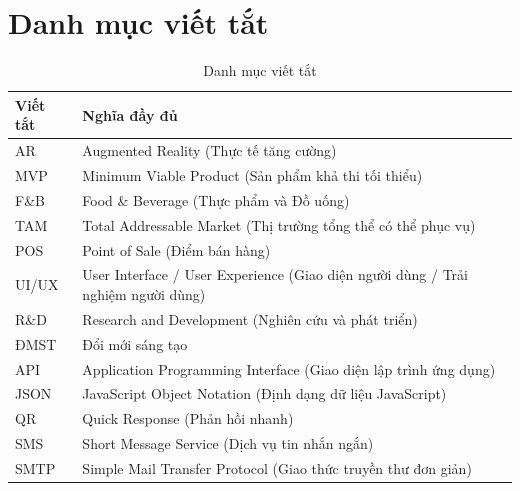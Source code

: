 \documentclass[12pt,a4paper]{article}
\begin{document}
\setcounter{page}{1} %
\pagestyle{fancy}
\fancyhf{} %
\fancyfoot[C]{\thepage} %
\renewcommand{\headrulewidth}{0.4pt} %
\renewcommand{\footrulewidth}{0pt}   %

\justifying %

\tableofcontents
\newpage

\listoftables
\newpage

\listoffigures
\newpage

\section*{Danh mục viết tắt} %

\begin{table}[H]
\centering
\caption{Danh mục viết tắt}
\label{tab:abbreviations}
\begin{tabular}{@{}p{3cm}@{\hspace{1cm}}p{10cm}@{}} %
    \toprule %
    \textbf{Viết tắt} & \textbf{Nghĩa đầy đủ} \\
    \midrule %
    AR & Augmented Reality (Thực tế tăng cường) \\
    MVP & Minimum Viable Product (Sản phẩm khả thi tối thiểu) \\
    F\&B & Food \& Beverage (Thực phẩm và Đồ uống) \\
    TAM & Total Addressable Market (Thị trường tổng thể có thể phục vụ) \\
    POS & Point of Sale (Điểm bán hàng) \\
    UI/UX & User Interface / User Experience (Giao diện người dùng / Trải nghiệm người dùng) \\
    R\&D & Research and Development (Nghiên cứu và phát triển) \\
    ĐMST & Đổi mới sáng tạo \\
    API & Application Programming Interface (Giao diện lập trình ứng dụng) \\
    JSON & JavaScript Object Notation \newline (Định dạng dữ liệu JavaScript) \\
    QR & Quick Response (Phản hồi nhanh) \\
    SMS & Short Message Service (Dịch vụ tin nhắn ngắn) \\
    SMTP & Simple Mail Transfer Protocol (Giao thức truyền thư đơn giản) \\
    \bottomrule %
\end{tabular}
\end{table}
\end{document}
